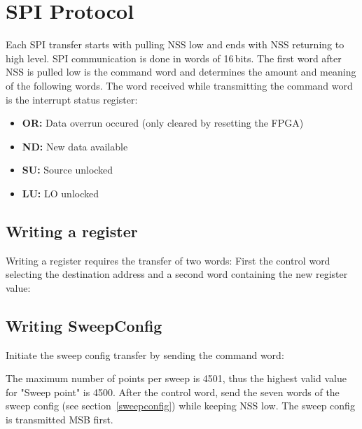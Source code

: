 \documentclass{article}
\newcommand{\bitrect}[2]{
  \begin{pgfonlayer}{foreground}
    \draw [thick] (0,0) rectangle (#1,1);
    \pgfmathsetmacro\result{#1-1}
    \foreach \x in {1,...,\result}
      \draw [thick] (\x,1) -- (\x, 0.8);
  \end{pgfonlayer}
  \bitlabels{#1}{#2}
}
\newcommand{\rwbits}[3]{
  \draw [thick] (#1,0) rectangle ++(#2,1) node[pos=0.5]{#3};
  \pgfmathsetmacro\start{#1+0.5}
  \pgfmathsetmacro\finish{#1+#2-0.5}
}
\newcommand{\robits}[3]{
  \begin{pgfonlayer}{background}
    \draw [thick, fill=lightgray] (#1,0) rectangle ++(#2,1) node[pos=0.5]{#3};
  \end{pgfonlayer}
  \pgfmathsetmacro\start{#1+0.5}
  \pgfmathsetmacro\finish{#1+#2-0.5}
}
\newcommand{\bitlabels}[2]{
  \foreach \bit in {1,...,#1}{
     \pgfmathsetmacro\result{#2}
     \node [above] at (\bit-0.5, 1) {\pgfmathprintnumber{\result}};
   }
}
\begin{document}
\section{SPI Protocol}
Each SPI transfer starts with pulling NSS low and ends with NSS returning to high level. SPI communication is done in words of 16\,bits. The first word after NSS is pulled low is the command word and determines the amount and meaning of the following words.
The word received while transmitting the command word is the interrupt status register:
\begin{center}
\end{center}
\begin{itemize}
\item \textbf{OR:} Data overrun occured (only cleared by resetting the FPGA)
\item \textbf{ND:} New data available
\item \textbf{SU:} Source unlocked
\item \textbf{LU:} LO unlocked
\end{itemize}
\subsection{Writing a register}
Writing a register requires the transfer of two words: First the control word selecting the destination address and a second word containing the new register value:
\begin{center}
\end{center}
\subsection{Writing SweepConfig}
Initiate the sweep config transfer by sending the command word:
\begin{center}
\end{center}
The maximum number of points per sweep is 4501, thus the highest valid value for "Sweep point" is 4500. After the control word, send the seven words of the sweep config (see section~\ref{sweepconfig}) while keeping NSS low. The sweep config is transmitted MSB first.
\end{document}
